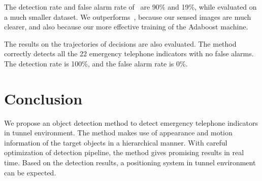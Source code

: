 The detection rate and false alarm rate of~\cite{wang1} are 90\% and 19\%, while evaluated on a much smaller dataset. We outperforms~\cite{wang1}, because our sensed images are much clearer, and also because our more effective training of the Adaboost machine.

The results on the trajectories of decisions are also evaluated. The method correctly detects all the 22 emergency telephone indicators with no false alarms. The detection rate is 100\%, and the false alarm rate is 0\%.

\section{Conclusion}
We propose an object detection method to detect emergency telephone indicators in tunnel environment. The method makes use of appearance and motion information of the target objects in a hierarchical manner. With careful optimization of detection pipeline, the method gives promising results in real time. Based on the detection results, a positioning system in tunnel environment can be expected.
